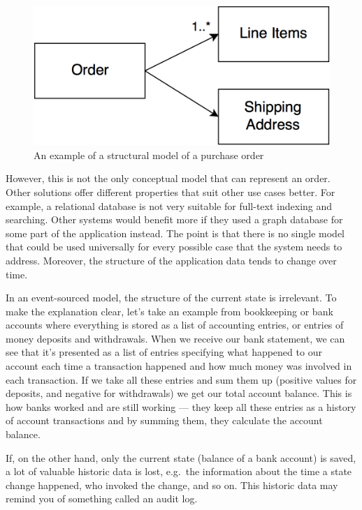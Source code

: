 \documentclass{book}
\begin{document}
\begin{figure}[h!]
\begin{center}
\includegraphics[width=0.7\columnwidth]{figures/relational-model/relational-model}
\caption{An example of a structural model of a purchase order%
}
\end{center}
\end{figure}

However, this is not the only conceptual model that can represent an
order. Other solutions offer different properties that suit other use
cases better. For example, a relational database is not very suitable
for full-text indexing and searching. Other systems would benefit more
if they used a graph database for some part of the application instead.
The point is that there is no single model that could be used
universally for every possible case that the system needs to address.
Moreover, the structure of the application data tends to change over
time.~\cite{greg-youtube}

In an event-sourced model, the structure of the current state is
irrelevant. To make the explanation clear, let's take an example from
bookkeeping or bank accounts where everything is stored as a list of
accounting entries, or entries of money deposits and withdrawals. When
we receive our bank statement, we can see that it's presented as a
list of entries specifying what happened to our account each time a
transaction happened and how much money was involved in each
transaction. If we take all these entries and sum them up (positive
values for deposits, and negative for withdrawals) we get our total
account balance. This is how banks worked and are still working --- they
keep all these entries as a history of account transactions and by
summing them, they calculate the account balance.

If, on the other hand, only the current state (balance of a bank account) is saved,
a lot of valuable historic data is lost, e.g.~the information about the
time a state change happened, who invoked the change, and so on. This
historic data may remind you of something called an audit log.
\end{document}
